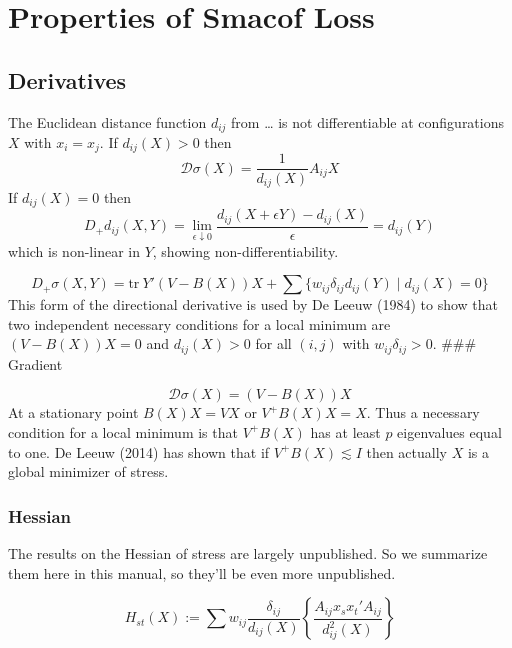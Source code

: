 \documentclass[
  12pt,
]{article}
\begin{document}
\section{Properties of Smacof Loss}\label{properties-of-smacof-loss}

\subsection{Derivatives}\label{derivatives}

The Euclidean distance function \(d_{ij}\) from \ldots{} is not differentiable at configurations
\(X\) with \(x_i=x_j\). If \(d_{ij}(X)>0\) then
\[
\mathcal{D}\sigma(X)=\frac{1}{d_{ij}(X)}A_{ij}X
\]
If \(d_{ij}(X)=0\) then
\[
D_+d_{ij}(X,Y)=\lim_{\epsilon\downarrow 0}\frac{d_{ij}(X+\epsilon Y)-d_{ij}(X)}{\epsilon}=d_{ij}(Y)
\]
which is non-linear in \(Y\), showing non-differentiability.

\[
D_+\sigma(X,Y)=\text{tr}\ Y'(V-B(X))X+\sum\{w_{ij}\delta_{ij}d_{ij}(Y)\mid d_{ij}(X)=0\}
\]
This form of the directional derivative is used by De Leeuw (1984) to show that
two independent necessary conditions for a local minimum are \((V-B(X))X=0\)
and \(d_{ij}(X)>0\) for all \((i,j)\) with \(w_{ij}\delta_{ij}>0\).
\#\#\# Gradient

\[
\mathcal{D}\sigma(X)=(V-B(X))X
\]
At a stationary point \(B(X)X=VX\) or \(V^+B(X)X=X\). Thus a necessary condition for a local minimum is that \(V^+B(X)\) has at least \(p\) eigenvalues equal to one. De Leeuw (2014) has
shown that if \(V^+B(X)\lesssim I\) then actually \(X\) is a global minimizer of stress.

\subsubsection{Hessian}\label{hessian}

The results on the Hessian of stress are largely unpublished. So we summarize them here in this manual, so they'll be even more unpublished.

\[
H_{st}(X):=\sum w_{ij}\frac{\delta_{ij}}{d_{ij}(X)}\left\{\frac{A_{ij}x_sx_t'A_{ij}}{d_{ij}^2(X)}\right\}
\]
\end{document}
